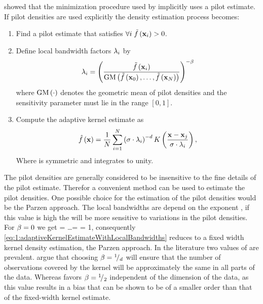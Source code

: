 	\textcite{silverman1986density} showed that the minimization procedure used by \citeauthor{breiman1977variable} implicitly uses a \KNN pilot estimate. If pilot densities are used explicitly the density estimation process becomes:
		\begin{enumerate}[labelindent=0ex]
			\item Find a pilot estimate \varPilotDensityFunction{\varPattern} that satisfies $\forall i\; \varPilotDensityFunction{\varPattern[i]} > 0$. 

			\item Define local bandwidth factors $\lambda_{i}$ by
				\begin{equation}\label{eq:1:localBandwidth}
					\varLocalBandwidth{i} = \left( \frac{\varPilotDensityFunction{\varPattern[i]}}{\varGeometricMeanFunction{\varPilotDensityFunction{\varPattern[0]}, \dotsc, \varPilotDensityFunction{\varPattern[\varNumPatterns]}}}  \right)^{- \varMBESensitivityParam}
				\end{equation}
				where $\text{GM}\left(\cdot\right)$ denotes the geometric mean of pilot densities and the sensitivity parameter \varMBESensitivityParam must lie in the range $\left[0, 1\right]$.
			\item Compute the adaptive kernel estimate as
				\begin{equation}\label{eq:1:adaptiveKernelEstimateWithLocalBandwidths}
					\varEstimatedDensityFunction{\varPattern} = \frac{1}{\varNumPatterns} \sum_{i = 1}^{\varNumPatterns} \left(\varBandwidth \cdot \varLocalBandwidth{i}\right)^{-\varDim} \varKernel{\frac{\varPattern - \varPattern[j]}{\varBandwidth \cdot  \varLocalBandwidth{i}}},
				\end{equation}
				Where \varKernel{\cdot} is symmetric and integrates to unity. 
		\end{enumerate}
	The pilot densities are generally considered to be insensitive to the fine details of the pilot estimate. Therefor a convenient method can be used to estimate the pilot densities. One possible choice for the estimation of the pilot densities would be the Parzen approach. 
	The local bandwidths are depend on the exponent \varMBESensitivityParam, if this value is high the \varLocalBandwidth{}will be more sensitive to variations in the pilot densities. For $\beta = 0$ we get  = \ldots =  = 1, consequently \cref{eq:1:adaptiveKernelEstimateWithLocalBandwidths} reduces to a fixed width kernel density estimation, \ie the Parzen approach. 
		In the literature two values of \varMBESensitivityParam are prevalent. \textcite{breiman1977variable} argue that choosing $\beta = {}^{1}\!/_{d}$ will ensure that the number of observations covered by the kernel will be approximately the same in all parts of the data. Whereas \citeauthor{silverman1986density} favors $\beta = {}^{1}\!/_{2}$ independent of the dimension of the data, as this value results in a bias that can be shown to be of a smaller order than that of the fixed-width kernel estimate.

